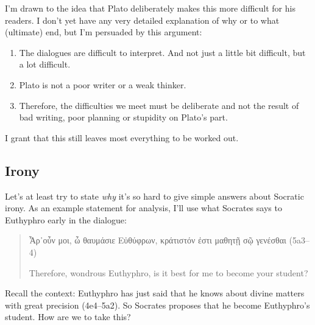 \documentclass[11pt]{article}
\begin{document}
I'm drawn to the idea that Plato deliberately makes this more difficult for
his readers.  I don't yet have any very detailed explanation of why or to
what (ultimate) end, but I'm persuaded by this argument:

\begin{enumerate}

    \item The dialogues are difficult to interpret.  And not just a little
        bit difficult, but a lot difficult.

    \item Plato is not a poor writer or a weak thinker.

    \item Therefore, the difficulties we meet must be deliberate and not
        the result of bad writing, poor planning or stupidity on Plato's
        part.

\end{enumerate}

I grant that this still leaves most everything to be worked out.


\subsection{Irony}

Let's at least try to state \emph{why} it's so hard to give simple answers
about Socratic irony.  As an example statement for analysis, I'll use what
Socrates says to Euthyphro early in the dialogue:

\begin{quote}

    {\g
    Ἆρ᾽οὖν μοι, ὦ θαυμάσιε Εὐθύφρων, κράτιστόν ἐστι μαθητῇ σῷ γενέσθαι
    } (5a3--4)

    Therefore, wondrous Euthyphro, is it best for me to become your
    student?

\end{quote}

Recall the context: Euthyphro has just said that he knows about divine
matters with great precision (4e4--5a2).  So Socrates proposes that he
become Euthyphro's student.  How are we to take this?
\end{document}
